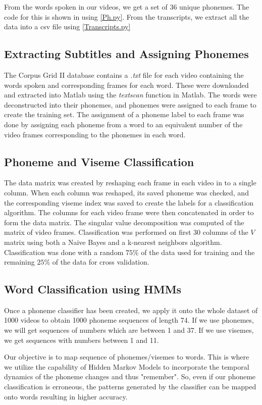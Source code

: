 \documentclass[a4paper]{article}
\begin{document}
From the words spoken in our videos, we get a set of 36 unique phonemes. The code for this is shown in using \ref{Ph.py}. From the transcripts, we extract all the data into a csv file using \ref{Transcripts.py}



\subsection{Extracting Subtitles and Assigning Phonemes}
The Corpus Grid II database contains a {\it .txt} file for each video containing the words spoken and corresponding frames for each word.  These were downloaded and extracted into Matlab using the {\it textscan} function in Matlab.  The words were deconstructed into their phonemes, and phonemes were assigned to each frame to create the training set.  The assignment of a phoneme label to each frame was done by assigning each phoneme from a word to an equivalent number of the video frames corresponding to the phonemes in each word. 

\subsection{Phoneme and Viseme Classification}
The data matrix was created by reshaping each frame in each video in to a single column.  When each column was reshaped, its saved phoneme was checked, and the corresponding viseme index was saved to create the labels for a classification algorithm. The columns for each video frame were then concatenated in order to form the data matrix.  The singular value decomposition was computed of the matrix of video frames.  Classification was performed on first 30 columns of the $V$ matrix using both a Naive Bayes and a k-nearest neighbors algorithm.  Classification was done with a random $75\%$ of the data used for training and the remaining $25\%$ of the data for cross validation.

\subsection{Word Classification using HMMs}

Once a phoneme classifier has been created, we apply it onto the whole dataset of 1000 videos to obtain 1000 phoneme sequences of length 74. If we use phonemes, we will get sequences of numbers which are between 1 and 37. If we use visemes, we get sequences with numbers between 1 and 11.

Our objective is to map sequence of phonemes/visemes to words. This is where we utilize the capability of Hidden Markov Models to incorporate the temporal dynamics of the phoneme changes and thus "remember". So, even if our phoneme classification is erroneous, the patterns generated by the classifier can be mapped onto words resulting in higher accuracy.
\end{document}
